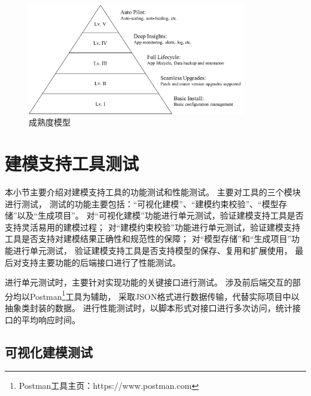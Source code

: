 \begin{figure}[h] %
    \centering %
    \includegraphics[width=0.85\textwidth]{FIGs/chapter5/maturity.pdf} %
    \caption{成熟度模型} %
    \label{maturity} %
\end{figure}%









\section{建模支持工具测试}

本小节主要介绍对建模支持工具的功能测试和性能测试。
主要对工具的三个模块进行测试，
测试的功能主要包括：“可视化建模”、“建模约束校验”、“模型存储”以及“生成项目”。
对“可视化建模”功能进行单元测试，验证建模支持工具是否支持灵活易用的建模过程；
对“建模约束校验”功能进行单元测试，验证建模支持工具是否支持对建模结果正确性和规范性的保障；
对“模型存储”和“生成项目”功能进行单元测试，
验证建模支持工具是否支持模型的保存、复用和扩展使用，
最后对支持主要功能的后端接口进行了性能测试。

进行单元测试时，主要针对实现功能的关键接口进行测试。
涉及前后端交互的部分均以Postman\footnote{Postman工具主页：https://www.postman.com}工具为辅助，
采取JSON格式进行数据传输，代替实际项目中以抽象类封装的数据。
进行性能测试时，以脚本形式对接口进行多次访问，统计接口的平均响应时间。

\subsection{可视化建模测试}

